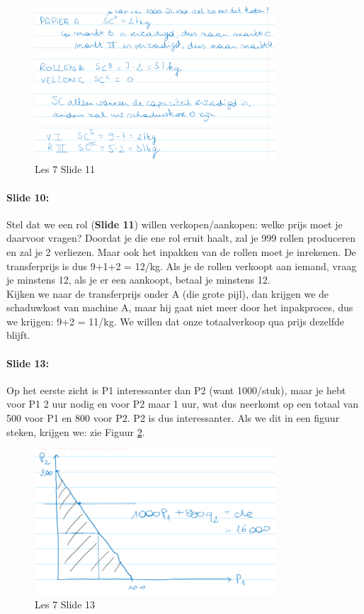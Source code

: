 \documentclass[10pt,a4paper]{report}
\begin{document}
\begin{figure}[h!]
\centering
\includegraphics[width=90mm]{Les07_04.png}
\caption{Les 7 Slide 11} 
\label{les07_04}
\end{figure}

\paragraph{Slide 10:} Stel dat we een rol (\textbf{Slide 11}) willen verkopen/aankopen: welke prijs moet je daarvoor vragen? Doordat je die ene rol eruit haalt, zal je 999 rollen produceren en zal je 2 verliezen. Maar ook het inpakken van de rollen moet je inrekenen. De transferprijs is dus 9+1+2 = 12/kg. Als je de rollen verkoopt aan iemand, vraag je minstens 12, als je er een aankoopt, betaal je minstens 12.\\
Kijken we naar de transferprijs onder A (die grote pijl), dan krijgen we de schaduwkost van machine A, maar hij gaat niet meer door het inpakproces, dus we krijgen: 9+2 = 11/kg. We willen dat onze totaalverkoop qua prijs dezelfde blijft.

\paragraph{Slide 13:} Op het eerste zicht is P1 interessanter dan P2 (want 1000/stuk), maar je hebt voor P1 2 uur nodig en voor P2 maar 1 uur, wat dus neerkomt op een totaal van 500 voor P1 en 800 voor P2. P2 is dus interessanter. Als we dit in een figuur steken, krijgen we: zie Figuur \ref{les07_05}.

\begin{figure}[h!]
\centering
\includegraphics[width=90mm]{Les07_05.png}
\caption{Les 7 Slide 13} 
\label{les07_05}
\end{figure}
\end{document}
